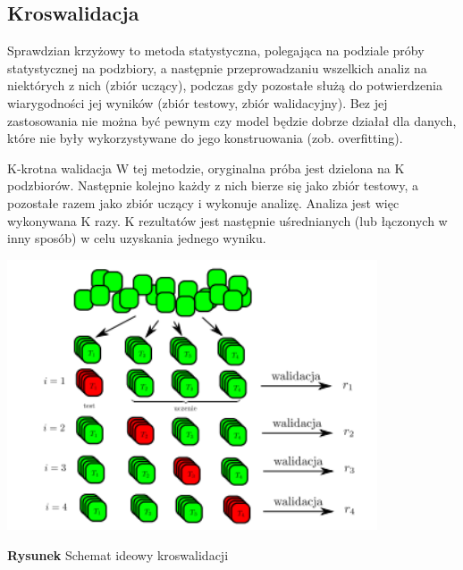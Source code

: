 \documentclass{classrep}
\begin{document}
\subsection{Kroswalidacja}
Sprawdzian krzyżowy to metoda statystyczna, polegająca na podziale próby statystycznej na podzbiory, a następnie przeprowadzaniu wszelkich analiz na niektórych z nich (zbiór uczący), podczas gdy pozostałe służą do potwierdzenia wiarygodności jej wyników (zbiór testowy, zbiór walidacyjny). Bez jej zastosowania nie można być pewnym czy model będzie dobrze działał dla danych, które nie były wykorzystywane do jego konstruowania (zob. overfitting).

K-krotna walidacja
W tej metodzie, oryginalna próba jest dzielona na K podzbiorów. Następnie kolejno każdy z nich bierze się jako zbiór testowy, a pozostałe razem jako zbiór uczący i wykonuje analizę. Analiza jest więc wykonywana K razy. K rezultatów jest następnie uśrednianych (lub łączonych w inny sposób) w celu uzyskania jednego wyniku.
\begin{center}
	\includegraphics[height=8cm]{kros.png}
	
	\textbf{Rysunek} \citep{wikipedia} Schemat ideowy kroswalidacji
\end{center}
\end{document}
